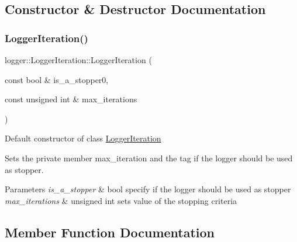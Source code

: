 \subsection{Constructor \& Destructor Documentation}
\mbox{\label{classlogger_1_1_logger_iteration_a79ab91e7e508f56cbfac3d670a79987c}} 
\subsubsection{\texorpdfstring{Logger\+Iteration()}{LoggerIteration()}}
{\footnotesize\ttfamily logger\+::\+Logger\+Iteration\+::\+Logger\+Iteration (\begin{DoxyParamCaption}\item[{const bool \&}]{is\+\_\+a\+\_\+stopper0,  }\item[{const unsigned int \&}]{max\+\_\+iterations }\end{DoxyParamCaption})}



Default constructor of class {\ttfamily \mbox{\hyperlink{classlogger_1_1_logger_iteration}{Logger\+Iteration}}} 

Sets the private member {\ttfamily max\+\_\+iteration} and the tag if the logger should be used as stopper.


\begin{DoxyParams}{Parameters}
{\em is\+\_\+a\+\_\+stopper} & {\ttfamily bool} specify if the logger should be used as stopper \\
\hline
{\em max\+\_\+iterations} & {\ttfamily unsigned int} sets value of the stopping criteria \\
\hline
\end{DoxyParams}


\subsection{Member Function Documentation}
\mbox{\label{classlogger_1_1_logger_iteration_ac7c2aace3ba5f22d8f42ec078fe62602}} 
